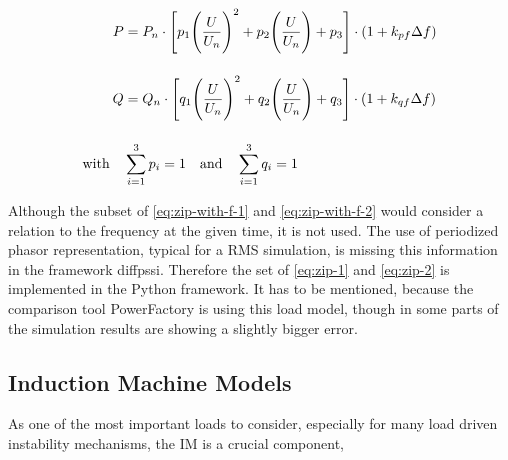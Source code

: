 
\begin{align}
        P&=P_n \cdot \Bigg[ p_1 \Bigg(\frac{U}{U_n}\Bigg)^2 + p_2 \Bigg(\frac{U}{U_n}\Bigg) + p_3 \Bigg] \cdot (1+k_{pf} \Delta f) \label{eq:zip-with-f-1} \\[12pt]
        Q&=Q_n \cdot \Bigg[ q_1 \Bigg(\frac{U}{U_n}\Bigg)^2 + q_2 \Bigg(\frac{U}{U_n}\Bigg) + q_3 \Bigg] \cdot (1+k_{qf} \Delta f) \label{eq:zip-with-f-2} \\[12pt]
        \text{with} \quad &\sum_{i=1}^{3} p_i =1 \quad \text{and} \quad \sum_{i=1}^{3} q_i =1 \notag
\end{align}

Although the subset of \autoref{eq:zip-with-f-1} and \autoref{eq:zip-with-f-2} would consider a relation to the frequency at the given time, it is not used. The use of periodized phasor representation, typical for a \acs{RMS} simulation, is missing this information in the framework diffpssi. Therefore the set of \autoref{eq:zip-1} and \autoref{eq:zip-2} is implemented in the Python framework. It has to be mentioned, because the comparison tool PowerFactory is using this load model, though in some parts of the simulation results are showing a slightly bigger error.

\subsection{Induction Machine Models}

As one of the most important loads to consider, especially for many load driven instability mechanisms, the \ac{IM} is a crucial component, \quelle


